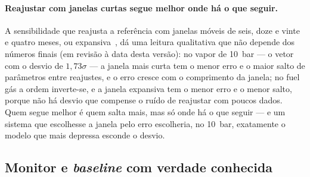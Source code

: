 \paragraph{Reajustar com janelas curtas segue melhor onde há o que seguir.}
A sensibilidade que reajusta a referência com janelas móveis de seis, doze e
vinte e quatro meses, ou expansiva~\cite{PesaranTimmermann2007}, dá uma
leitura qualitativa que não
depende dos números finais (em revisão à data desta versão): no vapor de
10~bar --- o vetor com o desvio de $1{,}73\sigma$ --- a janela mais curta
tem o menor erro e o maior salto de parâmetros entre reajustes, e o erro
cresce com o comprimento da janela; no fuel gás a ordem inverte-se, e a
janela expansiva tem o menor erro e o menor salto, porque não há desvio que
compense o ruído de reajustar com poucos dados. Quem segue melhor é quem
salta mais, mas só onde há o que seguir --- e um sistema que escolhesse a
janela pelo erro escolheria, no 10~bar, exatamente o modelo que mais depressa
esconde o desvio.

\subsection{Monitor e \emph{baseline} com verdade conhecida}
\label{sec:verdade-conhecida}

